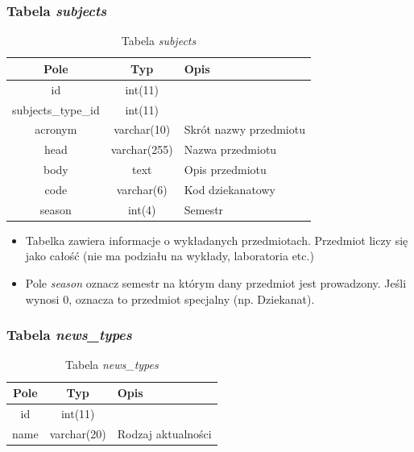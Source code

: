 \documentclass[a4paper,12pt,oneside]{report}
\begin{document}
\newpage
\subsubsection{Tabela \emph{subjects}}
\label{subsub:subjects}

\begin{table}[h]
  \centering
  \begin{tabular}{|c|c|l|}\hline
  Pole & Typ & Opis \\\hline
  id                 & int(11)      & \\
  subjects\_type\_id & int(11)      & \\
  acronym            & varchar(10)  & Skrót nazwy przedmiotu\\
  head               & varchar(255) & Nazwa przedmiotu \\
  body               & text         & Opis przedmiotu \\
  code               & varchar(6)   & Kod dziekanatowy \\
  season             & int(4)       & Semestr \\\hline
  \end{tabular}
  \caption{Tabela \emph{subjects}\label{tab:subjects}}
\end{table}
\begin{itemize}
  \item Tabelka zawiera informacje o wykładanych przedmiotach. Przedmiot liczy się jako całość (nie ma podziału na wykłady, laboratoria etc.)
  \item Pole \emph{season} oznacz semestr na którym dany przedmiot jest prowadzony. Jeśli wynosi 0, oznacza to przedmiot specjalny (np. Dziekanat).
\end{itemize}

\subsubsection{Tabela \emph{news\_types}}
\label{subsub:news_types}

\begin{table}[h]
  \centering
  \begin{tabular}{|c|c|l|}\hline
  Pole & Typ & Opis \\\hline
  id              & int(11)      & \\
  name & varchar(20) & Rodzaj aktualności \\\hline
  \end{tabular}
  \caption{Tabela \emph{news\_types}\label{tab:news_types}}
\end{table}
\end{document}
